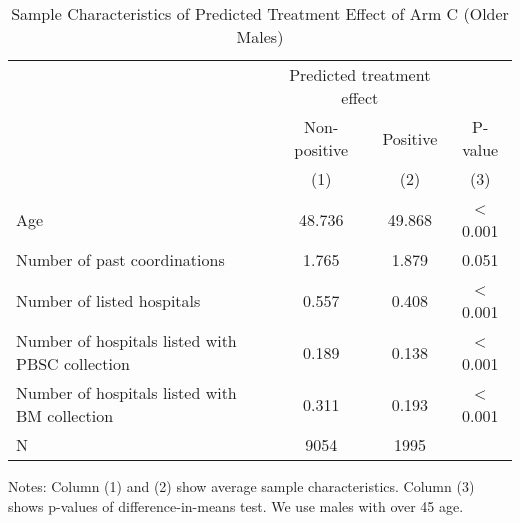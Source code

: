 \documentclass[
  11pt,
  a4paper
]{article}
\begin{document}
\begin{table}[H]

\caption{\label{tab:rcf-older-male}Sample Characteristics of Predicted Treatment Effect of Arm C (Older Males)}
\centering
\fontsize{9}{11}\selectfont
\fontsize{9}{11}\selectfont
\begin{threeparttable}
\begin{tabular}[t]{lccc}
\toprule
\multicolumn{1}{c}{ } & \multicolumn{2}{c}{Predicted treatment effect} & \multicolumn{1}{c}{ } \\
\cmidrule(l{3pt}r{3pt}){2-3}
\multicolumn{1}{c}{ } & \multicolumn{1}{c}{Non-positive} & \multicolumn{1}{c}{Positive} & \multicolumn{1}{c}{P-value} \\
\cmidrule(l{3pt}r{3pt}){2-2} \cmidrule(l{3pt}r{3pt}){3-3} \cmidrule(l{3pt}r{3pt}){4-4}
 & (1) & (2) & (3)\\
\midrule
Age & 48.736 & 49.868 & < 0.001\\
Number of past coordinations & 1.765 & 1.879 & 0.051\\
Number of listed hospitals & 0.557 & 0.408 & < 0.001\\
Number of hospitals listed with PBSC collection & 0.189 & 0.138 & < 0.001\\
Number of hospitals listed with BM collection & 0.311 & 0.193 & < 0.001\\
N & 9054 & 1995 & \\
\bottomrule
\end{tabular}
\begin{tablenotes}
\item Notes: Column (1) and (2) show average sample characteristics. Column (3) shows p-values of difference-in-means test. We use males with over 45 age.
\end{tablenotes}
\end{threeparttable}
\end{table}
\end{document}
